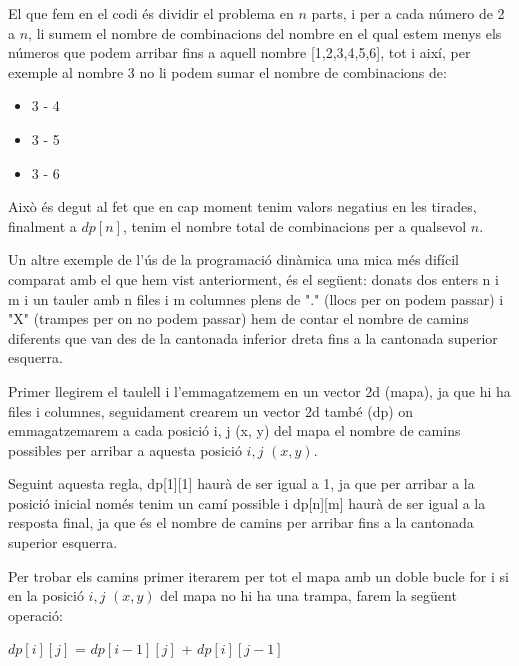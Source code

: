 El que fem en el codi és dividir el problema en $n$ parts, i per a cada número de 2 a $n$, li sumem el nombre de combinacions del nombre en el qual estem menys els números que podem arribar fins a aquell nombre [1,2,3,4,5,6], tot i així, per exemple al nombre 3 no li podem sumar el nombre de combinacions de:

\begin{itemize}
\item 3 - 4
\item 3 - 5
\item 3 - 6
\end{itemize}

Això és degut al fet que en cap moment tenim valors negatius en les tirades, finalment a $dp[n]$, tenim el nombre total de combinacions per a qualsevol $n$. \newline \newline

Un altre exemple de l'ús de la programació dinàmica una mica més difícil comparat amb el que hem vist anteriorment, és el següent: donats dos enters n i m i un tauler amb n files i m columnes plens de "." (llocs per on podem passar) i "X" (trampes per on no podem passar) hem de contar el nombre de camins diferents que van des de la cantonada inferior dreta fins a la cantonada superior esquerra.

Primer llegirem el taulell i l'emmagatzemem en un vector 2d (mapa), ja que hi ha files i columnes, seguidament crearem un vector 2d també (dp) on emmagatzemarem a cada posició i, j (x, y) del mapa el nombre de camins possibles per arribar a aquesta posició $i, j$ $(x, y)$.

Seguint aquesta regla, dp[1][1] haurà de ser igual a 1, ja que per arribar a la posició inicial només tenim un camí possible i dp[n][m] haurà de ser igual a la resposta final, ja que és el nombre de camins per arribar fins a la cantonada superior esquerra.

Per trobar els camins primer iterarem per tot el mapa amb un doble bucle for i si en la posició $i, j$ $(x, y)$ del mapa no hi ha una trampa, farem la següent operació: \newline

$dp[i][j]$ \hspace{0.1cm} = \hspace{0.1cm} $dp[i-1][j]$ \hspace{0.1cm} + \hspace{0.1cm} $dp[i][j-1]$ \newline

